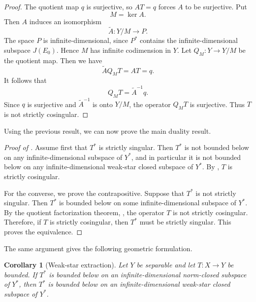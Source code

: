 \documentclass[11pt,reqno]{amsart}
\makeatletter
\theoremstyle{plain}
\newtheorem{corollary}[corollary]{Corollary}
\theoremstyle{definition}
\newcounter{problempaper}
\newenvironment{problempaperbody}{%
  \setcounter{subsection}{0}%
  \setcounter{subsubsection}{0}%
  \setcounter{paragraph}{0}%
  \renewcommand{\thesubsection}{\arabic{subsection}}%
  \renewcommand{\thesubsubsection}{\thesubsection.\arabic{subsubsection}}%
  \renewcommand{\theparagraph}{\thesubsubsection.\arabic{paragraph}}%
  \let\problem@outersection\section
  \let\problem@outersubsection\subsection
  \let\problem@outersubsubsection\subsubsection
  \let\problem@outerparagraph\paragraph
  \let\section\problem@papersection
  \let\subsection\problem@papersubsection
  \let\subsubsection\problem@papersubsubsection
}{%
  \let\section\problem@outersection
  \let\subsection\problem@outersubsection
  \let\subsubsection\problem@outersubsubsection
  \let\paragraph\problem@outerparagraph
}
\newcommand{\problem@target}[2]{%
  \hypertarget{problem-\theproblempaper-#1-#2}{}%
}
\newcommand{\problem@paperheading}[3]{%
  \par\bigskip
  \problem@target{#1}{#2}%
  \noindent{\large\bfseries #2.\quad #3\par}%
  \nobreak\smallskip
}
\newcommand{\problem@papersubheading}[3]{%
  \par\medskip
  \problem@target{#1}{#2}%
  \noindent{\normalsize\bfseries #2.\quad #3\par}%
  \nobreak\smallskip
}
\newcommand{\problem@papersubsubheading}[3]{%
  \par\smallskip
  \problem@target{#1}{#2}%
  \noindent{\normalsize\itshape #2.\quad #3.\ }%
}
\def\problem@papersection{%
  \@ifstar{\problem@papersectionstar}{\problem@papersectionnostar}%
}
\def\problem@papersectionstar#1{%
  \par\bigskip\noindent{\large\bfseries #1\par}\nobreak\smallskip
}
\def\problem@papersectionnostar#1{%
  \refstepcounter{subsection}%
  \setcounter{subsubsection}{0}%
  \setcounter{paragraph}{0}%
  \problem@paperheading{section}{\thesubsection}{#1}%
  \problem@writecontentsline{section}{\thesubsection}{#1}%
}
\def\problem@papersubsection{%
  \@ifstar{\problem@papersubsectionstar}{\problem@papersubsectionnostar}%
}
\def\problem@papersubsectionstar#1{%
  \par\medskip\noindent{\normalsize\bfseries #1\par}\nobreak\smallskip
}
\def\problem@papersubsectionnostar#1{%
  \refstepcounter{subsubsection}%
  \setcounter{paragraph}{0}%
  \problem@papersubheading{subsection}{\thesubsubsection}{#1}%
  \problem@writecontentsline{subsection}{\thesubsubsection}{#1}%
}
\def\problem@papersubsubsection{%
  \@ifstar{\problem@papersubsubsectionstar}{\problem@papersubsubsectionnostar}%
}
\def\problem@papersubsubsectionstar#1{%
  \par\smallskip\noindent{\normalsize\itshape #1.\ }%
}
\def\problem@papersubsubsectionnostar#1{%
  \refstepcounter{paragraph}%
  \problem@papersubsubheading{subsubsection}{\theparagraph}{#1}%
  \problem@writecontentsline{subsubsection}{\theparagraph}{#1}%
}
\newcommand{\problem@writecontentsline}[3]{%
  \begingroup
  \protected@write\@auxout{}{%
    \string\problemcontentsentry{\theproblempaper}{#1}{#2}{#3}{\thepage}%
  }%
  \endgroup
}
\newcommand{\problemcontentsentry}[5]{%
  \@ifundefined{problemcontents@#1}{%
    \expandafter\gdef\csname problemcontents@#1\endcsname{}%
  }{}%
  \expandafter\g@addto@macro\csname problemcontents@#1\endcsname{%
    \problemcontentsline{#1}{#2}{#3}{#4}{#5}%
  }%
}
\newcommand{\problemcontentslink}[4]{%
  \hyperlink{problem-#1-#2-#3}{#4}%
}
\newcommand{\problemcontentsline}[5]{%
  \ifstrequal{#2}{section}{%
    \par\noindent
    \problemcontentslink{#1}{#2}{#3}{\makebox[2.5em][l]{#3}#4}%
    \nobreak\dotfill
    \problemcontentslink{#1}{#2}{#3}{#5}\par
  }{%
    \ifstrequal{#2}{subsection}{%
      \par\noindent\hspace*{1.5em}%
      \problemcontentslink{#1}{#2}{#3}{\makebox[3.5em][l]{#3}#4}%
      \nobreak\dotfill
      \problemcontentslink{#1}{#2}{#3}{#5}\par
    }{%
      \par\noindent\hspace*{3em}%
      \problemcontentslink{#1}{#2}{#3}{\makebox[4.5em][l]{#3}#4}%
      \nobreak\dotfill
      \problemcontentslink{#1}{#2}{#3}{#5}\par
    }%
  }%
}
\makeatother
\begin{document}
\begin{problempaperbody}
\begin{proof}
The quotient map $q$ is surjective, so $AT=q$ forces $A$ to be surjective. Put
\begin{equation*}
        M=\ker A.
\end{equation*}
Then $A$ induces an isomorphism
\begin{equation*}
        \widetilde A\colon Y/M\to P.
\end{equation*}
The space $P$ is infinite-dimensional, since $P^*$ contains the infinite-dimensional subspace $J(E_0)$. Hence $M$ has infinite codimension in $Y$. Let $Q_M\colon Y\to Y/M$ be the quotient map. Then we have
\begin{equation*}
        \widetilde A Q_M T=AT=q.
\end{equation*}
It follows that
\begin{equation*}
        Q_M T=\widetilde A^{-1}q.
\end{equation*}
Since $q$ is surjective and $\widetilde A^{-1}$ is onto $Y/M$, the operator $Q_MT$ is surjective. Thus $T$ is not strictly cosingular.
\end{proof}

Using the previous result, we can now prove the main duality result. 

\begin{proof}[Proof of ]
Assume first that $T^*$ is strictly singular. Then $T^*$ is not bounded below on any infinite-dimensional subspace of $Y^*$, and in particular it is not bounded below on any infinite-dimensional weak-star closed subspace of $Y^*$. By , $T$ is strictly cosingular.

For the converse, we prove the contrapositive. Suppose that $T^*$ is not strictly singular. Then $T^*$ is bounded below on some infinite-dimensional subspace of $Y^*$. By the quotient factorization theorem, , the operator $T$ is not strictly cosingular. Therefore, if $T$ is strictly cosingular, then $T^*$ must be strictly singular. This proves the equivalence.
\end{proof}

The same argument gives the following geometric formulation.

\begin{corollary}[Weak-star extraction]
\label{p4:cor:wstar-extraction}
Let $Y$ be separable and let $T\colon X\to Y$ be bounded. If $T^*$ is bounded below on an infinite-dimensional norm-closed subspace of $Y^*$, then $T^*$ is bounded below on an infinite-dimensional weak-star closed subspace of $Y^*$.
\end{corollary}


\end{problempaperbody}
\end{document}
